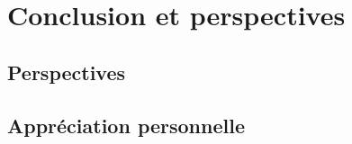 \chapter{Conclusion et perspectives}



\section{Perspectives}


    
    
\section{Appréciation personnelle}

    




    


